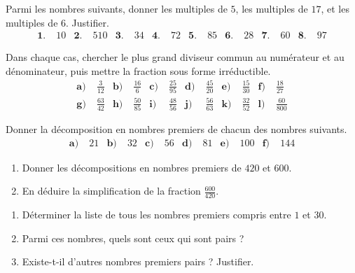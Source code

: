 \documentclass[11pt]{article}
\begin{document}
\begin{exo}
  Parmi les nombres suivants, donner les multiples de $5$, les multiples de
  $17$, et les multiples de $6$. Justifier.
  \begin{align*}
    \textbf{1.}&\; 10 &
    \textbf{2.}&\; 510 &
    \textbf{3.}&\; 34 &
    \textbf{4.}&\; 72 & 
    \textbf{5.}&\; 85 &
    \textbf{6.}&\; 28 &
    \textbf{7.}&\; 60 &
    \textbf{8.}&\; 97
  \end{align*}
\end{exo}

\begin{exo}
  Dans chaque cas, chercher le plus grand diviseur commun au numérateur et au
  dénominateur, puis mettre la fraction sous forme irréductible.
  \begin{align*}
    \textbf{a)}&\; \frac{3}{12} &
    \textbf{b)}&\; \frac{16}{6} &
    \textbf{c)}&\; \frac{25}{95} &
    \textbf{d)}&\; \frac{45}{20} &
    \textbf{e)}&\; \frac{15}{30} &
    \textbf{f)}&\; \frac{18}{27} \\
    \textbf{g)}&\; \frac{63}{42} &
    \textbf{h)}&\; \frac{50}{85} &
    \textbf{i)}&\; \frac{48}{56} &
    \textbf{j)}&\; \frac{56}{63} &
    \textbf{k)}&\; \frac{32}{52} &
    \textbf{l)}&\; \frac{60}{800}
  \end{align*}
\end{exo}

\begin{exo}
  Donner la décomposition en nombres premiers de chacun des nombres suivants.
  \begin{align*}
    \textbf{a)}&\; 21 &
    \textbf{b)}&\; 32 &
    \textbf{c)}&\; 56 &
    \textbf{d)}&\; 81 &
    \textbf{e)}&\; 100 &
    \textbf{f)}&\; 144
  \end{align*}
\end{exo}

\begin{exo}
  \begin{enumerate}
    \item Donner les décompositions en nombres premiers de $420$ et $600$.
    \item En déduire la simplification de la fraction $\frac{600}{420}$.
  \end{enumerate}
\end{exo}

\begin{exo}
  \begin{enumerate}
    \item Déterminer la liste de tous les nombres premiers compris entre $1$ et $30$.
    \item Parmi ces nombres, quels sont ceux qui sont pairs ?
    \item Existe-t-il d'autres nombres premiers pairs ? Justifier.
  \end{enumerate}
\end{exo}
\end{document}
